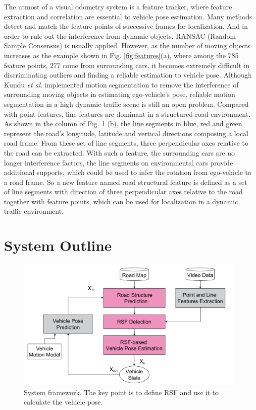 \documentclass[letterpaper, 10 pt, conference]{ieeeconf}  %
\begin{document}
The utmost of a visual odometry system is a feature tracker, where feature extraction and correlation are essential to vehicle pose estimation. Many methods detect and match the feature points of successive frames for localization. And in order to rule out the interference from dynamic objects, RANSAC (Random Sample Consensus) \cite{fischler1981random} is usually applied. However, as the number of moving objects increases as the example shown in Fig. \ref{fig:features}(a), where among the 785 feature points, 277 come from surrounding cars, it becomes extremely difficult in discriminating outliers and finding a reliable estimation to vehicle pose. Although Kundu \emph{et al}.\cite{kundu2011realtime}  implemented motion segmentation to remove the interference of surrounding moving objects in estimating ego-vehicle's pose, reliable motion segmentation in a high dynamic traffic scene is still an open problem.
Compared with point features, line features are dominant in a structured road environment. As shown in the column of Fig. 1 (b), the line segments in blue, red and green represent the road's longitude, latitude and vertical directions composing a local road frame.
From these set of line segments, three perpendicular axes relative to the road can be extracted. With such a feature, the surrounding cars are no longer interference factors, the line segments on environmental cars provide additional supports, which could be used to infer the rotation from ego-vehicle to a road frame.
So a new feature named road structural feature is defined as a set of line segments with direction of three perpendicular axes relative to the road together with feature points, which can be used for localization in a dynamic traffic environment.

\section{System Outline}

\begin{figure}
\centering
\includegraphics[width=0.9\linewidth]{source//Final//framework.pdf}
\caption{System framework. The key point is to define RSF and use it to calculate the vehicle pose.}
\label{fig:framework}
\end{figure}
\end{document}
